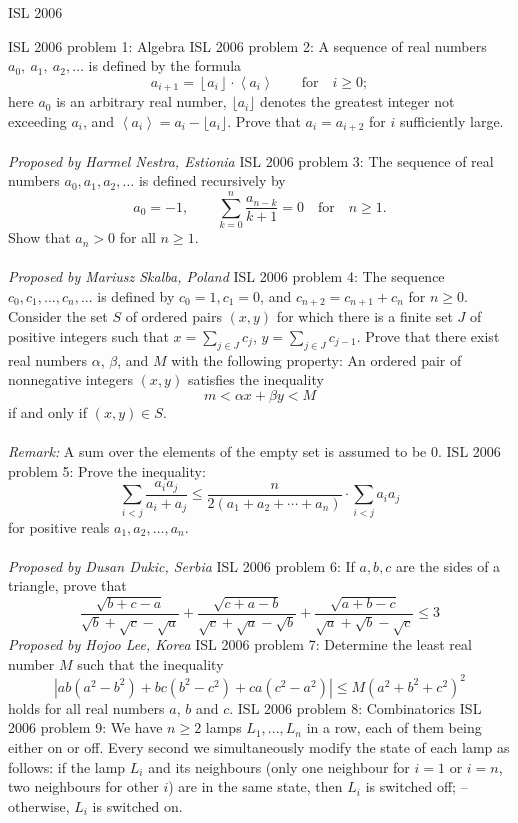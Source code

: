 ISL 2006 

ISL 2006 problem 1:  Algebra 
ISL 2006 problem 2:  A sequence of real numbers $ a_0,\ a_1,\ a_2,\dots$ is defined by the formula
\[
a_{i + 1} = \left\lfloor a_i\right\rfloor\cdot \left\langle a_i\right\rangle\qquad\text{for}\quad i\geq 0;
\]
here $a_0$ is an arbitrary real number, $\lfloor a_i\rfloor$ denotes the greatest integer not exceeding $a_i$, and $\left\langle a_i\right\rangle=a_i-\lfloor a_i\rfloor$.  Prove that $a_i=a_{i+2}$ for $i$ sufficiently large. \\\\
\textit{Proposed by Harmel Nestra, Estionia} 
ISL 2006 problem 3:  The sequence of real numbers $a_0,a_1,a_2,\ldots$ is defined recursively by
\[ a_0=-1,\qquad\sum_{k=0}^n\dfrac{a_{n-k}}{k+1}=0\quad\text{for}\quad n\geq 1. \]
Show that $ a_n > 0$ for all $ n\geq 1$. \\\\
\textit{Proposed by Mariusz Skalba, Poland} 
ISL 2006 problem 4:  The sequence $c_0, c_1, . . . , c_n, . . .$ is defined by $c_0= 1, c_1= 0$, and $c_{n+2}= c_{n+1}+c_n$ for $n \geq 0$. Consider the set $S$ of ordered pairs $(x, y)$ for which there is a finite set $J$ of positive integers such that $x=\textstyle\sum_{j \in J}{c_j}$, $y=\textstyle\sum_{j \in J}{c_{j-1}}$. Prove that there exist real numbers $\alpha$, $\beta$, and $M$ with the following property: An ordered pair of nonnegative integers $(x, y)$ satisfies the inequality
\[ m < \alpha x+\beta y < M \]
if and only if $(x, y) \in S$. \\\\
\textit{Remark:} A sum over the elements of the empty set is assumed to be $0$. 
ISL 2006 problem 5:  Prove the inequality:
\[
\sum_{i < j}{\frac {a_ia_j}{a_i + a_j}}\leq \frac {n}{2(a_1 + a_2 +\cdots + a_n)}\cdot \sum_{i < j}{a_ia_j}
\]
for positive reals $ a_1,a_2,\ldots,a_n$. \\\\
\textit{Proposed by Dusan Dukic, Serbia} 
ISL 2006 problem 6:  If $a,b,c$ are the sides of a triangle, prove that
\[
\frac{\sqrt{b+c-a}}{\sqrt{b}+\sqrt{c}-\sqrt{a}}+\frac{\sqrt{c+a-b}}{\sqrt{c}+\sqrt{a}-\sqrt{b}}+\frac{\sqrt{a+b-c}}{\sqrt{a}+\sqrt{b}-\sqrt{c}}\leq 3
\]
\textit{Proposed by Hojoo Lee, Korea} 
ISL 2006 problem 7:  Determine the least real number $M$ such that the inequality
\[ |ab(a^2-b^2)+bc(b^2-c^2)+ca(c^2-a^2)| \leq M(a^2+b^2+c^2)^2 \]
holds for all real numbers $a$, $b$ and $c$. 
ISL 2006 problem 8:  Combinatorics 
ISL 2006 problem 9:  We have $ n \geq 2$ lamps $ L_1, . . . ,L_n$ in a row, each of them being either on or off. Every second we simultaneously modify the state of each lamp as follows: if the lamp $ L_i$ and its neighbours (only one neighbour for $ i = 1$ or $ i = n$, two neighbours for other $ i$) are in the same state, then $ L_i$ is switched off; – otherwise, $ L_i$ is switched on. \\
